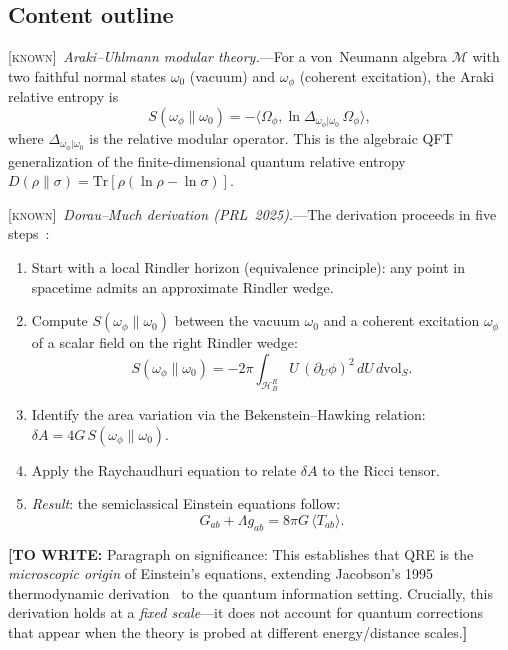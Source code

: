 \documentclass[prl,twocolumn,superscriptaddress,longbibliography,floatfix]{revtex4-2}
\newcommand{\Tr}{\mathrm{Tr}}
\newcommand{\known}{\textsc{[known]}}
\newcommand{\towrite}[1]{{\color{blue}\textbf{[TO WRITE:} #1\textbf{]}}}
\begin{document}
\subsection*{Content outline}

\known\ \emph{Araki--Uhlmann modular theory.}---For a von~Neumann
algebra $\mathcal{M}$ with two faithful normal states $\omega_0$
(vacuum) and $\omega_\phi$ (coherent excitation), the Araki relative
entropy is~\cite{Araki1976}
\begin{equation}
S(\omega_\phi \| \omega_0)
= -\langle \Omega_\phi, \ln \Delta_{\omega_\phi|\omega_0}\,
  \Omega_\phi \rangle,
\label{eq:araki_rel_ent}
\end{equation}
where $\Delta_{\omega_\phi|\omega_0}$ is the relative modular
operator. This is the algebraic QFT generalization of the
finite-dimensional quantum relative entropy
$D(\rho\|\sigma) = \Tr[\rho(\ln\rho - \ln\sigma)]$.

\known\ \emph{Dorau--Much derivation (PRL~2025).}---The derivation
proceeds in five steps~\cite{DorauMuch2025}:
\begin{enumerate}
\item Start with a local Rindler horizon (equivalence principle):
  any point in spacetime admits an approximate Rindler wedge.
\item Compute $S(\omega_\phi \| \omega_0)$ between the vacuum
  $\omega_0$ and a coherent excitation $\omega_\phi$ of a scalar
  field on the right Rindler wedge:
  \begin{equation}
  S(\omega_\phi \| \omega_0)
  = -2\pi \int_{\mathcal{H}_B^R} U\,(\partial_U \phi)^2\, dU\, d\mathrm{vol}_S.
  \label{eq:dorau_much_srel}
  \end{equation}
\item Identify the area variation via the Bekenstein--Hawking
  relation: $\delta A = 4G\, S(\omega_\phi \| \omega_0)$.
\item Apply the Raychaudhuri equation to relate $\delta A$ to
  the Ricci tensor.
\item \emph{Result}: the semiclassical Einstein equations follow:
  \begin{equation}
  \boxed{
  G_{ab} + \Lambda g_{ab} = 8\pi G\, \langle T_{ab} \rangle.
  }
  \label{eq:einstein_from_qre}
  \end{equation}
\end{enumerate}

\towrite{Paragraph on significance: This establishes that QRE is
the \emph{microscopic origin} of Einstein's equations, extending
Jacobson's 1995 thermodynamic derivation~\cite{Jacobson1995} to
the quantum information setting. Crucially, this derivation holds
at a \emph{fixed scale}---it does not account for quantum
corrections that appear when the theory is probed at different
energy/distance scales.}
\end{document}
